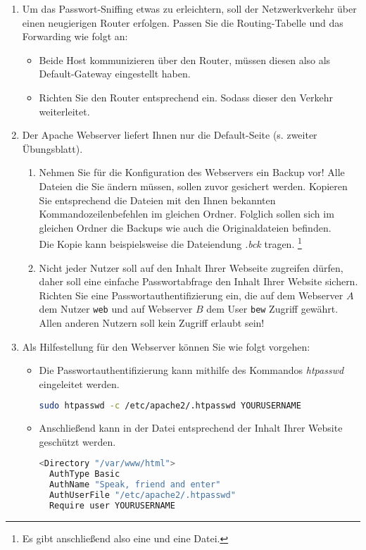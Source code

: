 \documentclass[paper=a4,fontsize=11pt]{scrartcl}%
\begin{document}
\begin{enumerate}
	\item Um das Passwort-Sniffing etwas zu erleichtern, soll der Netzwerkverkehr über einen neugierigen Router erfolgen. Passen Sie die Routing-Tabelle und das Forwarding wie folgt an:
	\begin{itemize}
		\item Beide Host kommunizieren über den Router, müssen diesen also als Default-Gateway eingestellt haben.
		\item Richten Sie den Router entsprechend ein. Sodass dieser den Verkehr weiterleitet. 		
	\end{itemize}
	\item Der Apache Webserver liefert Ihnen nur die Default-Seite (s. zweiter Übungsblatt).
	\begin{enumerate}
		\item Nehmen Sie für die Konfiguration des Webservers ein Backup vor! Alle Dateien die Sie ändern müssen, sollen zuvor gesichert werden. Kopieren Sie entsprechend die Dateien mit den Ihnen bekannten Kommandozeilenbefehlen im gleichen Ordner. Folglich sollen sich im gleichen Ordner die Backups wie auch die Originaldateien befinden.\\
	Die Kopie kann beispielsweise die Dateiendung \emph{.bck} tragen. \footnote{Es gibt anschließend also eine  und eine  Datei.}
		\item Nicht jeder Nutzer soll auf den Inhalt Ihrer Webseite zugreifen dürfen, daher soll eine einfache Passwortabfrage den Inhalt Ihrer Website sichern.\\
	Richten Sie eine Passwortauthentifizierung ein, die auf dem Webserver $A$ dem Nutzer \texttt{web} und auf Webserver $B$ dem User \texttt{bew} Zugriff gewährt. Allen anderen Nutzern soll kein Zugriff erlaubt sein!
	\end{enumerate}
	\item Als Hilfestellung für den Webserver können Sie wie folgt vorgehen:
	\begin{itemize}
	\item Die Passwortauthentifizierung kann mithilfe des Kommandos \emph{htpasswd} eingeleitet werden.
\begin{lstlisting}[style=Bash, language=Bash]
sudo htpasswd -c /etc/apache2/.htpasswd YOURUSERNAME
\end{lstlisting} \label{htpasswd}
	\item Anschließend kann in der Datei  entsprechend der Inhalt Ihrer Website geschützt werden.
\begin{lstlisting}[style=Bash, language=Bash]
<Directory "/var/www/html">
  AuthType Basic
  AuthName "Speak, friend and enter"
  AuthUserFile "/etc/apache2/.htpasswd"
  Require user YOURUSERNAME


\end{lstlisting}
\end{itemize}
\end{enumerate}
\end{document}
